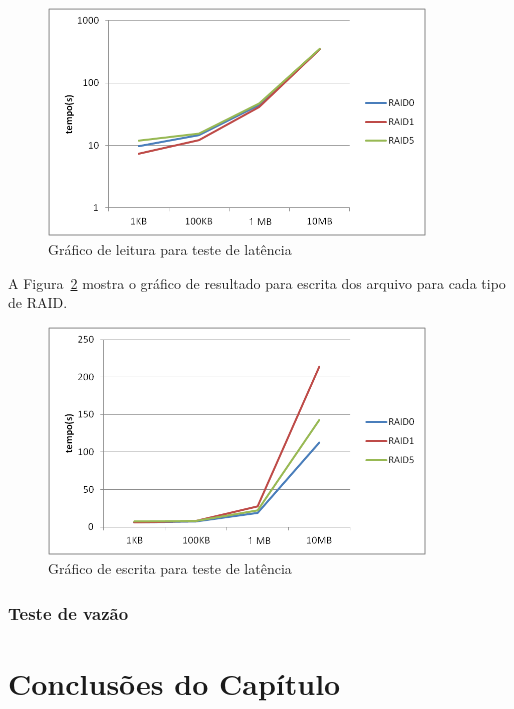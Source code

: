 	\begin{figure}[htb]
		\begin{center}
			
			\includegraphics[clip,width=10.0cm]{images/resultados/latencia_leitura.png}
			\caption{Gráfico de leitura para teste de latência}
			\label{fig:lat_leit}
		\end{center}
	\end{figure}
	
	A Figura~\ref{fig:lat_esc} mostra o gráfico de resultado para escrita dos arquivo para cada tipo de RAID.
	
	\begin{figure}[htb]
		\begin{center}
			
			\includegraphics[clip,width=10.0cm]{images/resultados/latencia_escrita.png}
			\caption{Gráfico de escrita para teste de latência}
			\label{fig:lat_esc}
		\end{center}
	\end{figure}
	
	\subsubsection{Teste de vazão}	
	
	\section{Conclusões do Capítulo}